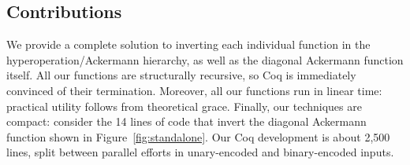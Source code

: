 \subsection{Contributions}
We provide a complete solution to inverting each individual function in the hyperoperation/Ackermann hierarchy,
as well as the diagonal Ackermann function itself.  All our functions are structurally recursive, so
Coq is immediately convinced of their termination.  Moreover, all our functions run in linear time: practical utility follows from theoretical grace.
Finally, our techniques are compact: consider the 14 lines of code that invert the diagonal Ackermann function shown in Figure~\ref{fig:standalone}. Our Coq development is about 2,500 lines, split between parallel efforts in unary-encoded and binary-encoded inputs.
